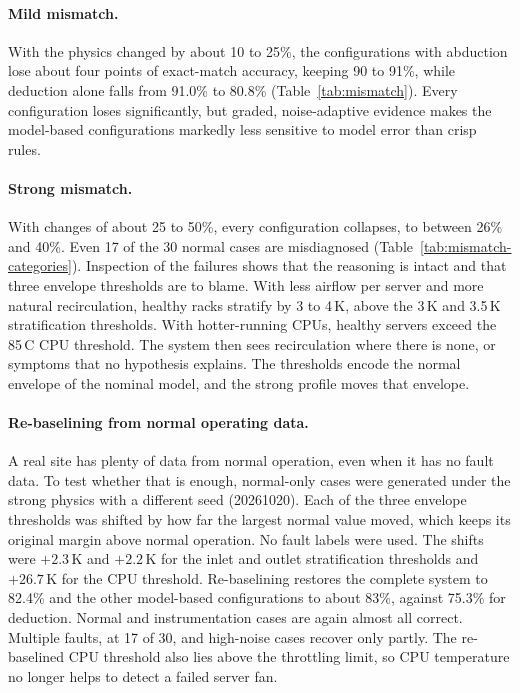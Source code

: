 


\paragraph{Mild mismatch.} With the physics changed by about 10 to 25\%, the configurations with abduction lose about four points of exact-match accuracy, keeping 90 to 91\%, while deduction alone falls from 91.0\% to 80.8\% (Table~\ref{tab:mismatch}). Every configuration loses significantly, but graded, noise-adaptive evidence makes the model-based configurations markedly less sensitive to model error than crisp rules.

\paragraph{Strong mismatch.} With changes of about 25 to 50\%, every configuration collapses, to between 26\% and 40\%. Even 17 of the 30 normal cases are misdiagnosed (Table~\ref{tab:mismatch-categories}). Inspection of the failures shows that the reasoning is intact and that three envelope thresholds are to blame. With less airflow per server and more natural recirculation, healthy racks stratify by 3 to 4\,K, above the 3\,K and 3.5\,K stratification thresholds. With hotter-running CPUs, healthy servers exceed the 85\,\textdegree C CPU threshold. The system then sees recirculation where there is none, or symptoms that no hypothesis explains. The thresholds encode the normal envelope of the nominal model, and the strong profile moves that envelope.

\paragraph{Re-baselining from normal operating data.} A real site has plenty of data from normal operation, even when it has no fault data. To test whether that is enough, normal-only cases were generated under the strong physics with a different seed (20261020). Each of the three envelope thresholds was shifted by how far the largest normal value moved, which keeps its original margin above normal operation. No fault labels were used. The shifts were $+2.3$\,K and $+2.2$\,K for the inlet and outlet stratification thresholds and $+26.7$\,K for the CPU threshold. Re-baselining restores the complete system to 82.4\% and the other model-based configurations to about 83\%, against 75.3\% for deduction. Normal and instrumentation cases are again almost all correct. Multiple faults, at 17 of 30, and high-noise cases recover only partly. The re-baselined CPU threshold also lies above the throttling limit, so CPU temperature no longer helps to detect a failed server fan.

